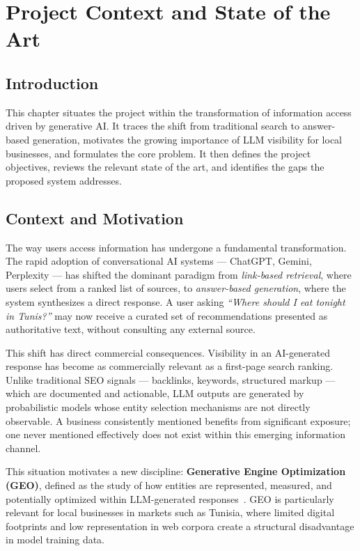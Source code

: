 \chapter{Project Context and State of the Art}
\renewcommand{\chaptername}{Chapter}

\section*{Introduction}

This chapter situates the project within the transformation of information access
driven by generative AI. It traces the shift from traditional search to answer-based
generation, motivates the growing importance of LLM visibility for local businesses,
and formulates the core problem. It then defines the project objectives, reviews the
relevant state of the art, and identifies the gaps the proposed system addresses.

\section{Context and Motivation}

The way users access information has undergone a fundamental transformation. The
rapid adoption of conversational AI systems — ChatGPT, Gemini, Perplexity — has
shifted the dominant paradigm from \textit{link-based retrieval}, where users select
from a ranked list of sources, to \textit{answer-based generation}, where the system
synthesizes a direct response. A user asking \textit{``Where should I eat tonight in
Tunis?''} may now receive a curated set of recommendations presented as authoritative
text, without consulting any external source.

This shift has direct commercial consequences. Visibility in an AI-generated response
has become as commercially relevant as a first-page search ranking. Unlike traditional
SEO signals — backlinks, keywords, structured markup — which are documented and
actionable, LLM outputs are generated by probabilistic models whose entity selection
mechanisms are not directly observable. A business consistently mentioned benefits
from significant exposure; one never mentioned effectively does not exist within this
emerging information channel.

This situation motivates a new discipline: \textbf{Generative Engine Optimization
(GEO)}, defined as the study of how entities are represented, measured, and
potentially optimized within LLM-generated responses~\cite{aggarwal2023geo}. GEO is
particularly relevant for local businesses in markets such as Tunisia, where limited
digital footprints and low representation in web corpora create a structural
disadvantage in model training data.

